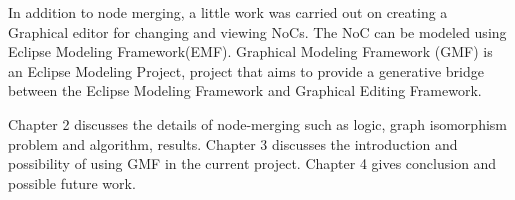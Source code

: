 In addition to node merging, a little work was carried out on creating a Graphical editor for changing and viewing NoCs. The NoC can be modeled using Eclipse Modeling Framework(EMF). 
Graphical Modeling Framework (GMF) is an Eclipse Modeling Project, project that aims to provide a generative bridge between the Eclipse Modeling Framework and Graphical Editing Framework. 

Chapter 2 discusses the details of node-merging such as logic, graph isomorphism problem and algorithm, results. 
Chapter 3 discusses the introduction and possibility of using GMF in the current project.
Chapter 4 gives conclusion and possible future work. 


